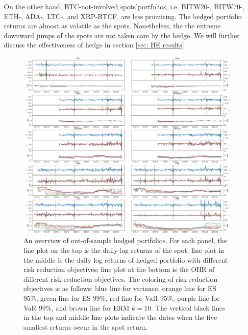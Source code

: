 On the other hand, BTC-not-involved spots'portfolios,  i.e. BITW20-, BITW70-, ETH-, ADA-, LTC-, and XRP-BTCF, are less promising.
The hedged portfolio returns are almost as volatile as the spots.
Nonetheless, the the extreme downward jumps of the spots are not taken care by the hedge.
We will further discuss the effectiveness of hedge in section \ref{sec: HE results}. \medskip

\begin{figure}[ht]
    \centering
    \includegraphics[width=\textwidth]{_pics/overview.pdf}
  \caption{An overview of out-of-sample hedged portfolios.
            For each panel, the line plot on the top is the daily log returns of the spot;
            line plot in the middle is the daily log returns of hedged portfolio with different risk reduction objectives;
            line plot at the bottom is the OHR of different risk reduction objectives. The coloring of risk reduction objectives is as follows:
                                      \textcolor{plt1}{blue line} for variance,
                                      \textcolor{plt2}{orange line} for ES 95\%,
                                      \textcolor{plt3}{green line} for ES 99\%,
                                      \textcolor{plt4}{red line} for VaR 95\%,
                                      \textcolor{plt5}{purple line} for VaR 99\%, and
                                      \textcolor{plt6}{brown line} for ERM $k=10$.
            The vertical black lines in the top and middle line plots indicate the dates when the five smallest returns occur in the spot return.
}
\end{figure}
